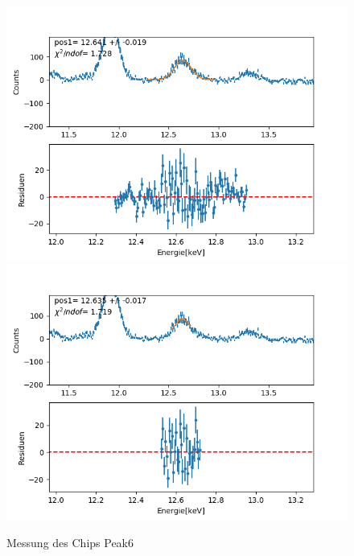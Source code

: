 \documentclass[12pt,a4paper]{article}
\begin{document}
\begin{figure}[H]
\centering
\includegraphics[scale=0.49]{Bilder/roentgen_spektren/chip/chip6_1.png}
\includegraphics[scale=0.49]{Bilder/roentgen_spektren/chip/chip6_2.png}
\caption{Messung des Chips Peak6}
\end{figure}
\end{document}
